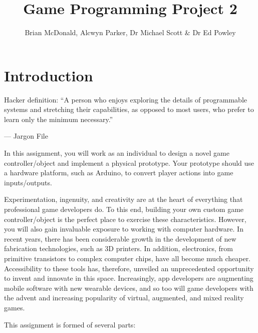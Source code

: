 \documentclass{../../fal_assignment}
\title{Game Programming Project 2}
\author{Brian McDonald, Alcwyn Parker, Dr Michael Scott \& Dr Ed Powley}
\begin{document}
\maketitle

\section*{Introduction}

\begin{marginquote}
Hacker definition: ``A person who enjoys exploring the details of programmable systems and stretching their capabilities, as opposed to most users, who prefer to learn only the minimum necessary.''

--- Jargon File

\end{marginquote}

In this assignment, you will work as an individual to design a novel game controller/object and implement a physical prototype. Your prototype should use a hardware platform, such as Arduino, to convert player actions into game inputs/outputs. 

Experimentation, ingenuity, and creativity are at the heart of everything that professional game developers do. To this end, building your own custom game controller/object is the perfect place to exercise these characteristics. However, you will also gain invaluable exposure to working with computer hardware. In recent years, there has been considerable growth in the development of new fabrication technologies, such as 3D printers. In addition, electronics, from primitive transistors to complex computer chips, have all become much cheaper. Accessibility to these tools has, therefore, unveiled an unprecedented opportunity to invent and innovate in this space. Increasingly, app developers are augmenting mobile software with new wearable devices, and so too will game developers with the advent and increasing popularity of virtual, augmented, and mixed reality games.


This assignment is formed of several parts:
\end{document}
